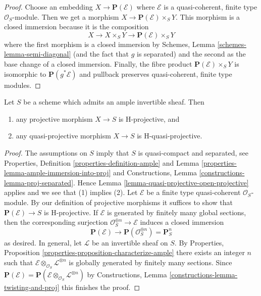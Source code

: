 \begin{proof}
Choose an embedding $X \to \mathbf{P}(\mathcal{E})$ where $\mathcal{E}$
is a quasi-coherent, finite type $\mathcal{O}_S$-module. Then
we get a morphism $X \to \mathbf{P}(\mathcal{E}) \times_S Y$.
This morphism is a closed immersion because it is the composition
$$
X \to X \times_S Y \to \mathbf{P}(\mathcal{E}) \times_S Y
$$
where the first morphism is a closed immersion by
Schemes, Lemma \ref{schemes-lemma-semi-diagonal}
(and the fact that $g$ is separated) and
the second as the base change of a closed immersion.
Finally, the fibre product $\mathbf{P}(\mathcal{E}) \times_S Y$
is isomorphic to $\mathbf{P}(g^*\mathcal{E})$ and pullback
preserves quasi-coherent, finite type modules.
\end{proof}

\begin{lemma}
\label{lemma-projective-over-quasi-projective-is-H-projective}
Let $S$ be a scheme which admits an ample invertible sheaf. Then
\begin{enumerate}
\item any projective morphism $X \to S$ is H-projective, and
\item any quasi-projective morphism $X \to S$ is H-quasi-projective.
\end{enumerate}
\end{lemma}

\begin{proof}
The assumptions on $S$ imply that $S$ is quasi-compact and separated, see
Properties, Definition \ref{properties-definition-ample} and
Lemma \ref{properties-lemma-ample-immersion-into-proj}
and Constructions, Lemma \ref{constructions-lemma-proj-separated}.
Hence Lemma \ref{lemma-quasi-projective-open-projective}
applies and we see that (1) implies (2).
Let $\mathcal{E}$ be a finite type quasi-coherent $\mathcal{O}_S$-module.
By our definition of projective morphisms it suffices to show that
$\mathbf{P}(\mathcal{E}) \to S$ is H-projective.
If $\mathcal{E}$ is generated by finitely many global sections,
then the corresponding surjection $\mathcal{O}_S^{\oplus n} \to \mathcal{E}$
induces a closed immersion
$$
\mathbf{P}(\mathcal{E}) \longrightarrow
\mathbf{P}(\mathcal{O}_S^{\oplus n}) = \mathbf{P}^n_S
$$
as desired. In general, let $\mathcal{L}$ be an invertible sheaf on $S$.
By Properties, Proposition \ref{properties-proposition-characterize-ample}
there exists an integer $n$ such that
$\mathcal{E} \otimes_{\mathcal{O}_S} \mathcal{L}^{\otimes n}$
is globally generated by finitely many sections. Since
$\mathbf{P}(\mathcal{E}) =
\mathbf{P}(\mathcal{E} \otimes_{\mathcal{O}_S} \mathcal{L}^{\otimes n})$ by
Constructions, Lemma \ref{constructions-lemma-twisting-and-proj}
this finishes the proof.
\end{proof}

